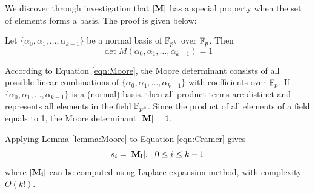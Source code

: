 We discover through investigation that ${|\bf M}|$ has a special property when the set of elements forms a basis. The proof is given below:
\begin{Lemma}
\label{lemma:Moore}
Let $\{\alpha_0,\alpha_1,\dots,\alpha_{k-1}\}$ be a normal basis of ${\mathbb{F}}_{p^k}$ over ${\mathbb{F}}_{p}$. Then
\begin{equation}
\det{M(\alpha_0,\alpha_1,\dots,\alpha_{k-1})} = 1
\end{equation}
\end{Lemma}
\begin{Proof}
According to Equation \ref{eqn:Moore}, the Moore determinant consists of all possible linear combinations of 
$\{\alpha_0,\alpha_1,\dots,\alpha_{k-1}\}$ with coefficients over ${\mathbb{F}}_{p}$. If $\{\alpha_0,\alpha_1,\dots,\alpha_{k-1}\}$
is a (normal) basis, then all product terms are distinct and represents all elements in the field ${\mathbb{F}}_{p^k}$. Since the product 
of all elements of a field equals to 1, the Moore determinant ${|\bf M}|=1$.
\end{Proof}

Applying Lemma \ref{lemma:Moore} to Equation \ref{eqn:Cramer} gives
\begin{equation}
s_i = {|\bf M_i|},~~0\leq i\leq k-1
\end{equation}
where ${|\bf M_i|}$ can be computed using Laplace expansion method, with complexity $O(k!)$.


